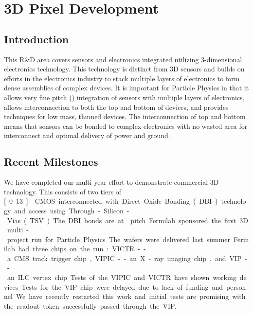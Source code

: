 \section{3D Pixel Development}
\subsection{Introduction}
This R\&D area covers sensors and electronics integrated utilizing 3-dimensional electronics technology.  This technology is distinct from 3D sensors and builds on efforts in the electronics industry to stack multiple layers of electronics to form dense assemblies of complex devices.  It is important for Particle Physics in that it allows very fine pitch (\unit[4]{\micron}) integration of sensors with multiple layers of electronics, allows interconnection to both the top and bottom of devices, and provides techniques for low mass, thinned devices. The interconnection of top and bottom means that sensors can be bonded to complex electronics with no wasted area for interconnect and optimal delivery of power and ground.
\subsection{Recent Milestones}
We have completed our multi-year effort to demonstrate commercial 3D technology. This consists of two tiers of \unit[0.13]{\micron} CMOS interconnected with Direct Oxide Bonding (DBI) technology and access using Through-Silicon-Vias (TSV). The DBI bonds are at \unit[4]{\micron} pitch. Fermilab sponsored the first 3D multi-project run for Particle Physics. The wafers were delivered last summer. Fermilab had three chips on the run: VICTR -- a CMS track trigger chip, VIPIC -- an X-ray imaging chip, and VIP -- an ILC vertex chip. Tests of the VIPIC and VICTR have shown working devices.  Tests for the VIP chip were delayed due to lack of funding and personnel.  We have recently restarted this work and initial tests are promising with the readout token successfully passed through the VIP.

